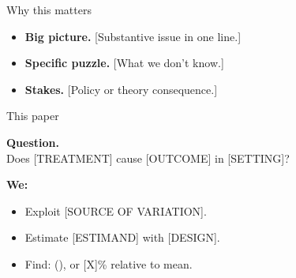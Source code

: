 
\begin{frame}{Why this matters}
  \begin{itemize}
    \item<1->\textbf{Big picture.} [Substantive issue in one line.]
    \item<2->\textbf{Specific puzzle.} [What we don't know.]
    \item<3->\textbf{Stakes.} [Policy or theory consequence.]
  \end{itemize}

\end{frame}

\begin{frame}{This paper}
  \begin{center}\Large
    \textbf{Question.}\\[0.4em]
    Does [TREATMENT] cause [OUTCOME] in [SETTING]?
  \end{center}

  \medskip
  \textbf{We:}
  \begin{itemize}
    \item Exploit [SOURCE OF VARIATION].
    \item Estimate [ESTIMAND] with [DESIGN].
    \item Find: \alert{\headlineEstimate{} (\headlineSE{})},
          or [X]\% relative to mean.
  \end{itemize}
\end{frame}
